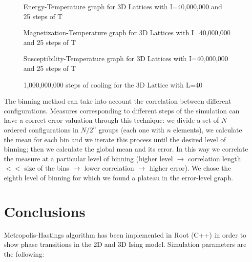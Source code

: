 \documentclass[11pt,a4paper]{article}
\begin{document}
\begin{figure}[h!]
  \centering
  
  \caption{Energy-Temperature graph for 3D Lattices with I=40,000,000 and 25 steps of T}
\end{figure}

\begin{figure}[h!]
  \centering
 
  \caption{Magnetization-Temperature graph for 3D Lattices with I=40,000,000 and 25 steps of T}
\end{figure}

\begin{figure}[h!]
  \centering
  
  \caption{Susceptibility-Temperature graph for 3D Lattices with I=40,000,000 and 25 steps of T}
\end{figure}

\begin{figure}[h!]
  \centering
 
  \caption{1,000,000,000 steps of cooling for the 3D Lattice with L=40}
\end{figure}



The binning method can take into account the correlation between different configurations. Measures corresponding to different steps of the simulation can have a correct error valuation through this technique: we divide a set of $N$ ordered configurations in $N/2^n$ groups (each one with $n$ elements), we calculate the mean for each bin and we iterate this process until the desired level of binning; then we calculate the global mean and its error. In this way we correlate the measure at a particular level of binning (higher level $\rightarrow$ correlation length $<<$ size of the bins $\rightarrow$ lower correlation $\rightarrow$ higher error). We chose the eighth level of binning for which we found a plateau in the error-level graph. 

\newpage
\section{Conclusions}
Metropolis-Hastings algorithm has been implemented in Root (C++) in order to show phase transitions in the 2D and 3D Ising model. Simulation parameters are the following:

\begin{center}
\end{center}
\end{document}

